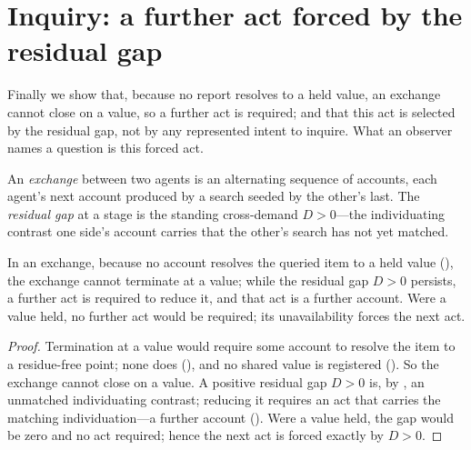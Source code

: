 \documentclass[11pt,twocolumn,a4paper]{article}
\newcommand{\dem}{D}
\begin{document}
\section{Inquiry: a further act forced by the residual gap}
\label{sec:inquiry}

Finally we show that, because no report resolves to a held value, an
exchange cannot close on a value, so a further act is required; and that
this act is selected by the residual gap, not by any represented intent to
inquire. What an observer names a question is this forced act.

\begin{definition}
\label{def:exchange}
An \emph{exchange} between two agents is an alternating sequence of accounts,
each agent's next account produced by a search seeded by the other's last.
The \emph{residual gap} at a stage is the standing cross-demand
$\dem>0$---the individuating contrast one side's account carries that the
other's search has not yet matched.
\end{definition}

\begin{theorem}
\label{thm:forcedact}
In an exchange, because no account resolves the queried item to a held value
(), the
exchange cannot terminate at a
value; while the residual gap $\dem>0$ persists, a further act is required to
reduce it, and that act is a further account. Were a value held, no further
act would be required; its unavailability forces the next act.
\end{theorem}

\begin{proof}
Termination at a value would require some account to resolve the item to a
residue-free point; none does (),
and no shared value
is registered (). So the exchange cannot close on a
value. A positive residual gap $\dem>0$ is, by , an
unmatched individuating contrast; reducing it requires an act that carries
the matching individuation---a further account (). Were
a value held, the gap would be zero and no act required; hence the next act
is forced exactly by $\dem>0$.
\end{proof}
\end{document}
